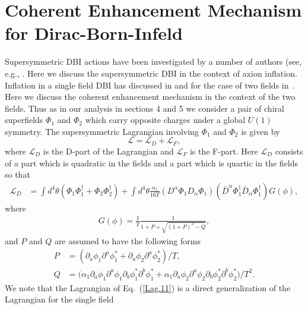 \documentclass[12pt]{article}
\begin{document}
\section{Coherent Enhancement Mechanism for Dirac-Born-Infeld \label{sec7}}
Supersymmetric DBI actions have been investigated by a number of authors
(see, e.g., \cite{Khoury:2010gb,Khoury:2011da,Baumann:2011nk,Baumann:2011nm,Rocek:1997hi,Tseytlin:1999dj,Ito:2007hy,Billo:2008sp,Sasaki:2012ka,Aoki:2016tod}.
Here we discuss the supersymmetric DBI in the context of axion inflation.
Inflation in a  single field DBI has discussed in \cite{Sasaki:2012ka} and for the case of two fields in~\cite{Nath:2018xxe}.
Here we discuss the coherent enhancement mechanism in the context of the two fields.
Thus  as in our analysis in sections  4 and 5 we consider a pair of chiral superfields $\Phi_1$ and $\Phi_2$ which carry opposite
charges under a global $U(1)$ symmetry.
The supersymmetric Lagrangian involving $\Phi_1$ and $\Phi_2$ is given by
\begin{equation}
  \mathcal{L}= \mathcal{L}_D+\mathcal{L}_{F},
  \label{1.1}
\end{equation}
where $\mathcal{L}_D$ is the D-part of the Lagrangian and $\mathcal{L}_{F}$ is the F-part. Here  $\mathcal{L}_D$
consists of a part  which is quadratic in the fields and a part  which is quartic in the fields so that
\begin{align}
  \mathcal{L}_D
   & = \int d^4\theta \left(\Phi_1 \Phi_1^\dagger + \Phi_2 \Phi_2^\dagger \right)+      \int d^4\theta
  \frac{\alpha_1}{16T}\left(D^\alpha \Phi_1 D_\alpha \Phi_1\right)\left({\bar{D}}^{\dot{\alpha}}\Phi_1^\dagger {\bar{D}}_{\dot{\alpha}}\Phi_1^\dagger \right)
  G(\phi),
  \label{Lag.11}
\end{align}
where
\begin{align}
  G(\phi) = \frac{1}{T}\frac{1}{1+ P +\sqrt{(1+P)^2 -Q}},
\end{align}
and $P$ and $Q$ are assumed to have the following forms
\begin{align}
  P & = (\partial_a\phi_1 \partial^a \phi^*_1 + \partial_a\phi_2 \partial^a \phi^*_2)/T, \nonumber\\
  Q & = \Big(
  \alpha_1\partial_a \phi_1 \partial^a \phi_1 \partial_b \phi^*_1 \partial^b \phi^*_1
  + \alpha_1 \partial_a \phi_2 \partial^a \phi_2 \partial_b \phi^*_2 \partial^b \phi^*_2
  \Big) / T^2.
  \label{Lag.22}
\end{align}
We note that the Lagrangian of Eq.~(\ref{Lag.11}) is a direct generalization of the Lagrangian for the single field
\end{document}
